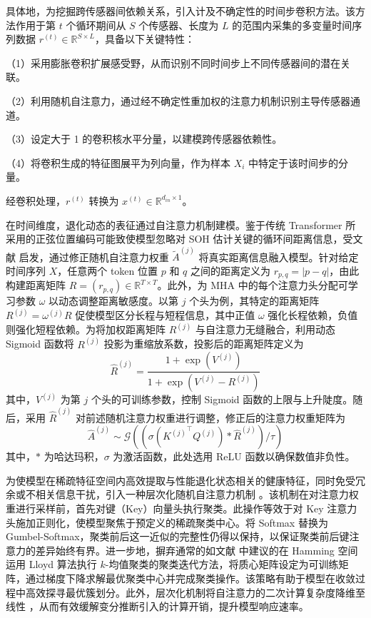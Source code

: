 具体地，为挖掘跨传感器间依赖关系，引入计及不确定性的时间步卷积方法。该方法作用于第 $t$ 个循环期间从 $S$ 个传感器、长度为 $L$ 的范围内采集的多变量时间序列数据 $r^{(t)} \in \mathbb{R}^{S \times L}$，具备以下关键特性：

（1）采用膨胀卷积扩展感受野，从而识别不同时间步上不同传感器间的潜在关联。

（2）利用随机自注意力，通过经不确定性重加权的注意力机制识别主导传感器通道。

（3）设定大于 1 的卷积核水平分量，以建模跨传感器依赖性。

（4）将卷积生成的特征图展平为列向量，作为样本 $X_i$ 中特定于该时间步的分量。

经卷积处理，$r^{(t)}$ 转换为 $x^{(t)} \in \mathbb{R}^{d_{in} \times 1}$。

在时间维度，退化动态的表征通过自注意力机制建模。鉴于传统 Transformer 所采用的正弦位置编码可能致使模型忽略对 SOH 估计关键的循环间距离信息，受文献 \cite{wu-etal-2021-da} 启发，通过修正随机自注意力权重 $\tilde{A}^{(j)}$ 将真实距离信息融入模型。针对给定时间序列 $X$，任意两个 token 位置 $p$ 和 $q$ 之间的距离定义为 $r_{p,q}=|p-q|$，由此构建距离矩阵 $R=(r_{p,q}) \in \mathbb{R}^{T \times T}$。此外，为 MHA 中的每个注意力头分配可学习参数 $\omega$ 以动态调整距离敏感度。以第 $j$ 个头为例，其特定的距离矩阵 $R^{(j)}=\omega^{(j)}R$ 促使模型区分长程与短程信息，其中正值 $\omega$ 强化长程依赖，负值则强化短程依赖。为将加权距离矩阵 $R^{(j)}$ 与自注意力无缝融合，利用动态 Sigmoid 函数将 $R^{(j)}$ 投影为重缩放系数，投影后的距离矩阵定义为
% 
\begin{equation}
\hat{R}^{(j)} = \frac{1+\exp(V^{(j)})}{1+\exp(V^{(j)}-R^{(j)})}
\label{eq:distance_matrix_coefficient}
\end{equation}
%
其中，$V^{(j)}$ 为第 $j$ 个头的可训练参数，控制 Sigmoid 函数的上限与上升陡度。随后，采用 $\hat{R}^{(j)}$ 对前述随机注意力权重进行调整，修正后的注意力权重矩阵为
% 
\begin{equation}
\hat{A}^{(j)} \sim \mathcal{G}((\sigma({K^{(j)}}^\top Q^{(j)}) * \hat{R}^{(j)}) / {\tau})
\label{eq:distance_sensitive_self_attention}
\end{equation}
%
其中，$*$ 为哈达玛积，$\sigma$ 为激活函数，此处选用 ReLU 函数以确保数值非负性。

为使模型在稀疏特征空间内高效提取与性能退化状态相关的健康特征，同时免受冗余或不相关信息干扰，引入一种层次化随机自注意力机制 \cite{clustered_attention_vyas2020fast}。该机制在对注意力权重进行采样前，首先对键（Key）向量头执行聚类。此操作等效于对 Key 注意力头施加正则化，使模型聚焦于预定义的稀疏聚类中心。将 Softmax 替换为 Gumbel-Softmax，聚类前后这一近似的完整性仍得以保持，以保证聚类前后键注意力的差异始终有界。进一步地，摒弃通常的如文献 \cite{clustered_attention_vyas2020fast} 中建议的在 Hamming 空间运用  Lloyd 算法执行 $k$-均值聚类的聚类迭代方法，将质心矩阵设定为可训练矩阵，通过梯度下降求解最优聚类中心并完成聚类操作。该策略有助于模型在收敛过程中高效探寻最优簇划分。此外，层次化机制将自注意力的二次计算复杂度降维至线性 \cite{clustered_attention_vyas2020fast}，从而有效缓解变分推断引入的计算开销，提升模型响应速率。

